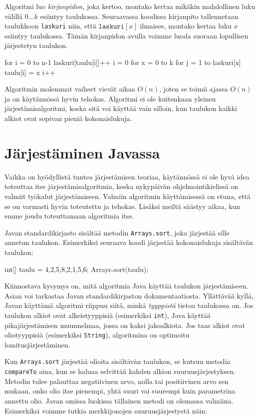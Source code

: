 Algoritmi luo \emph{kirjanpidon}, joka kertoo,
montako kertaa mikä\-kin mahdollinen luku välillä $0 \dots k$
esiintyy taulukossa.
Seuraavassa koodissa kirjanpito tallennetaan
taulukkoon \texttt{laskuri} niin, että
$\texttt{laskuri}[x]$ ilmaisee,
montako kertaa luku $x$ esiintyy taulukossa.
Tämän kirjanpidon avulla voimme luoda suoraan
lopullisen järjestetyn taulukon.

\begin{code}
for i = 0 to n-1
    laskuri[taulu[i]]++
i = 0
for x = 0 to k
    for j = 1 to laskuri[x]
        taulu[i] = x
        i++
\end{code}

Algoritmin molemmat vaiheet vievät aikaa $O(n)$,
joten se toimii ajassa $O(n)$ ja on käytännössä hyvin tehokas.
Algoritmi ei ole kuitenkaan yleinen järjestämisalgoritmi,
koska sitä voi käyttää vain silloin,
kun taulukon kaikki alkiot ovat sopivan pieniä kokonaislukuja.


\section{Järjestäminen Javassa}

Vaikka on hyödyllistä tuntea järjestämisen teoriaa,
käytännössä ei ole hyvä idea toteuttaa itse
järjestämisalgoritmia, koska nykypäivän ohjelmointikielissä
on valmiit työkalut järjestämiseen.
Valmiin algoritmin käyttämisessä on etuna,
että se on varmasti hyvin toteutettu ja tehokas.
Lisäksi meiltä säästyy aikaa, kun emme joudu
toteuttamaan algoritmia itse.

Javan standardikirjasto sisältää metodin \texttt{Arrays.sort},
joka järjestää sille annetun taulukon.
Esimerkiksi seuraava koodi järjestää kokonaislukuja
sisältävän taulukon:

\begin{code}
int[] taulu = {4,2,5,8,2,1,5,6};
Arrays.sort(taulu);
\end{code}

Kiinnostava kysymys on, mitä algoritmia Java käyttää
taulukon järjes\-tämiseen.
Asian voi tarkastaa Javan standardikirjaston
dokumentaatiosta.
Yllättävää kyllä, Javan käyttämä algoritmi riippuu siitä,
minkä \emph{tyyppistä} tietoa taulukossa on.
Jos taulukon alkiot ovat alkeistyyppisiä
(esimerkiksi \texttt{int}), Java käyttää 
pikajärjestämisen muunnelmaa,
jossa on kaksi jakoalkiota.
Jos taas alkiot ovat oliotyyppisiä
(esimerkiksi \texttt{String}),
algoritmina on optimoitu lomitusjärjestäminen.

Kun \texttt{Arrays.sort} järjestää olioita sisältävän taulukon,
se kutsuu metodia \texttt{compareTo} aina, kun se haluaa selvittää
kahden alkion suuruusjärjestyksen.
Metodin tulee palauttaa negatiivinen arvo, nolla tai positiivinen arvo
sen mukaan, onko olio itse pienempi, yhtä suuri vai suurempi
kuin parametrina annettu olio.
Javan omissa luokissa tällainen metodi on olemassa valmiina.
Esimerkiksi voimme tutkia merkkijonojen suuruusjärjestystä näin:

